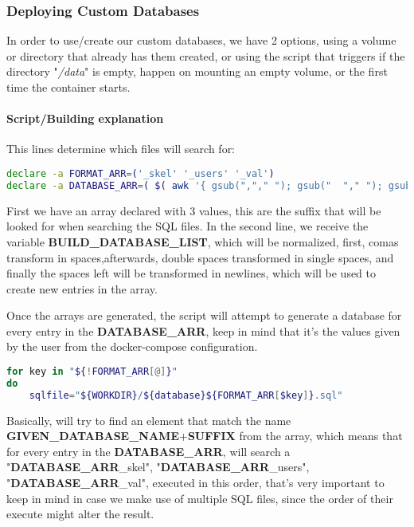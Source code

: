 \subsubsection[Deploying Custom Databases]{Deploying Custom Databases}
\begin{flushleft}
    In order to use/create our custom databases, we have 2 options, using a volume or directory that already has them
    created, or using the script that triggers if the directory "\textit{/data}" is empty, happen on mounting an empty
    volume, or the first time the container starts.
\end{flushleft}
\paragraph{Script/Building explanation}
\begin{flushleft}
    This lines determine which files will search for:
    \begin{lstlisting}[language=bash,label={lst:declare_array}]
declare -a FORMAT_ARR=('_skel' '_users' '_val')
declare -a DATABASE_ARR=( $( awk '{ gsub(","," "); gsub("  "," "); gsub(" ","\n"); print}' <<< "$BUILD_DATABASE_LIST" ) );\end{lstlisting}
    First we have an array declared with 3 values, this are the suffix that will be looked for when searching the SQL files.
    In the second line, we receive the variable \textbf{BUILD\_DATABASE\_LIST}, which will be normalized, first, comas transform
    in spaces,afterwards, double spaces transformed in single spaces, and finally the spaces left will be transformed in newlines,
    which will be used to create new entries in the array.

    \begin{flushleft}
        Once the arrays are generated, the script will attempt to generate a database for every entry in the
        \textbf{DATABASE\_ARR}, keep in mind that it's the values given by the user from the docker-compose configuration.
    \end{flushleft}

    \begin{lstlisting}[language=bash,label={lst:for_array}]
for key in "${!FORMAT_ARR[@]}"
do
    sqlfile="${WORKDIR}/${database}${FORMAT_ARR[$key]}.sql"\end{lstlisting}
    Basically, will try to find an element that match the name \textbf{GIVEN\_DATABASE\_NAME}+\textbf{SUFFIX} from the array,
    which means that for every entry in the \textbf{DATABASE\_ARR}, will search a "\textbf{DATABASE\_ARR}\_skel",
    "\textbf{DATABASE\_ARR}\_users", "\textbf{DATABASE\_ARR}\_val", executed in this order, that's very important to
    keep in mind in case we make use of multiple SQL files, since the order of their execute might alter the result.
\end{flushleft}

